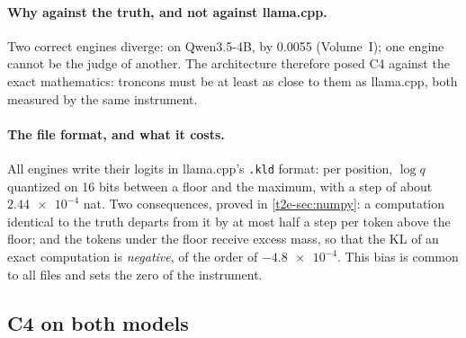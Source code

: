 \paragraph{Why against the truth, and not against llama.cpp.} Two correct engines diverge: on Qwen3.5-4B, by \num{0.0055} (Volume~I); one engine cannot be the judge of another. The architecture therefore posed C4 against the exact mathematics: troncons must be at least as close to them as llama.cpp, both measured by the same instrument.

\paragraph{The file format, and what it costs.} All engines write their logits in llama.cpp's \texttt{.kld} format: per position, $\log q$ quantized on 16 bits between a floor and the maximum, with a step of about $\num{2.44e-4}$ nat. Two consequences, proved in \cref{t2e-sec:numpy}: a computation identical to the truth departs from it by at most half a step per token above the floor; and the tokens under the floor receive excess mass, so that the KL of an exact computation is \emph{negative}, of the order of $-\num{4.8e-4}$. This bias is common to all files and sets the zero of the instrument.

\subsection{C4 on both models}

